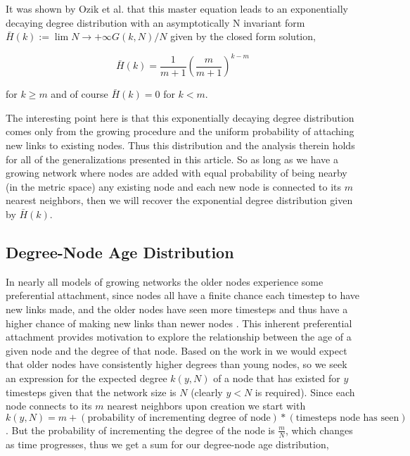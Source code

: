 \documentclass[aps,pre,reprint,superscriptaddress,amsmath,amssymb]{revtex4-1}
\begin{document}
It was shown by Ozik et al. \cite{ozik2004} that this master equation leads to an exponentially decaying degree distribution with an asymptotically N invariant form $\bar{H}(k) := \lim{N \to +\infty} G(k,N)/N$ given by the closed form solution,

\[\bar{H}(k) = \frac{1}{m+1}\left(\frac{m}{m+1}\right)^{k-m}\]

for $k \geq m$ and of course $\bar{H}(k) = 0$ for $k < m$.

The interesting point here is that this exponentially decaying degree distribution comes only from the growing procedure and the uniform probability of attaching new links to existing nodes.
Thus this distribution and the analysis therein holds for all of the generalizations presented in this article. 
So as long as we have a growing network where nodes are added with equal probability of being nearby (in the metric space) any existing node and each new node is connected to its $m$ nearest neighbors, then we will recover the exponential degree distribution given by $\bar{H}(k)$.


\subsection{Degree-Node Age Distribution}
In nearly all models of growing networks the older nodes experience some preferential attachment, since nodes all have a finite chance each timestep to have new links made, and the older nodes have seen more timesteps and thus have a higher chance of making new links than newer nodes \cite{reallyrandom}.
This inherent preferential attachment provides motivation to explore the relationship between the age of a given node and the degree of that node. 
Based on the work in \cite{reallyrandom} we would expect that older nodes have consistently higher degrees than young nodes, so we seek an expression for the expected degree $k(y,N)$ of a node that has existed for $y$ timesteps given that the network size is $N$ (clearly $y < N$ is required).
Since each node connects to its $m$ nearest neighbors upon creation we start with $k(y,N) = m + (\text{probability of incrementing degree of node})*(\text{timesteps node has seen})$.
But the probability of incrementing the degree of the node is $\frac{m}{N}$, which changes as time progresses, thus we get a sum for our degree-node age distribution,
\end{document}
